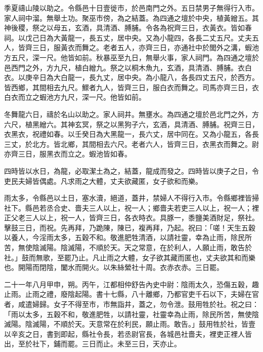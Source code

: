季夏禱山陵以助之。令縣邑十日壹徙市，於邑南門之外。五日禁男子無得行入市。家人祠中溜。無舉土功。聚巫市傍，為之結蓋。為四通之壇於中央，植黃繒五。其神後稷，祭之以母五，玄酒，具清酒、膊脯。令各為祝齊三日，衣黃衣。皆如春祠。以戊己日為大黃龍一，長五丈，居中央。又為小龍四，各長二丈五尺。丈夫五人，皆齊三日，服黃衣而舞之。老者五人，亦齊三日，亦通社中於閭外之溝，蝦池方五尺，深一尺。他皆如前。秋暴巫至九日，無舉火事，家人祠門。為四通之壇於邑西門之外，方九尺，植白繒九。祭之以桐木魚九，玄酒，具清酒、膊脯。衣白衣。以庚辛日為大白龍一，長九丈，居中央。為小龍八，各長四丈五尺，於西方。皆西鄉，其間相去九尺。鰥者九人，皆齊三日，服白衣而舞之。司馬亦齊三日，衣白衣而立之蝦池方九尺，深一尺。他皆如前。


冬舞龍六日，禱於名山以助之。家人祠井。無壅水。為四通之壇於邑北門之外，方六尺，植黑繒六。其神玄冥，祭之以黑狗子六，玄酒，具清酒、膊脯。祝齊三日，衣黑衣，祝禮如春。以壬癸日為大黑龍一，長六丈，居中同在。又為小龍五，各長三丈，於北方。皆北鄉，其間相去六尺。老者六人，皆齊三日，衣黑衣而舞之。尉亦齊三日，服黑衣而立之。蝦池皆如春。


四時皆以水日，為龍，必取潔土為之，結蓋，龍成而發之。四時皆以庚子之日，令吏民夫婦皆偶處。凡求雨之大體，丈夫欲藏匿，女子欲和而樂。




雨太多，令縣邑以土日，塞水瀆，絕道，蓋井，禁婦人不得行入市。令縣鄉裡皆掃社下。縣邑若丞合史、嗇夫三人以上，祝一人；鄉嗇夫若吏三人以上，祝一人；裡正父老三人以上，祝一人，皆齊三日，各衣時衣。具豚一，黍鹽美酒財足，祭社。擊鼓三日，而祝。先再拜，乃跪陳，陳已，複再拜，乃起。祝曰：「嗟！天生五穀以養人，今淫雨太多，五穀不和。敬進肥牲清酒，以請社靈，幸為止雨，除民所苦，無使陰滅陽。陰滅陽，不順於天。天之常意，在於利人，人願止雨，敢告於社。」鼓而無歌，至罷乃止。凡止雨之大體，女子欲其藏而匿也，丈夫欲其和而樂也。開陽而閉陰，闔水而開火。以朱絲縈社十周。衣赤衣赤。三日罷。

二十一年八月甲申，朔。丙午，江都相仲舒告內史中尉：陰雨太久，恐傷五穀，趣止雨。止雨之禮，廢陰起陽。書十七縣，八十離鄉，乃都官吏千石以下，夫婦在官者，咸遣婦歸。女子不得至市，市無詣井，蓋之，勿令泄。鼓用牲於社。祝之曰：「雨以太多，五穀不和，敬進肥牲，以請社靈，社靈幸為止雨，除民所苦，無使陰滅陽。陰滅陽，不順於天。天意常在於利民，願止雨。敢告。」鼓用牲於社，皆壹以辛亥之日，書到即起，縣社令長，若丞尉官長，各城邑社嗇夫，裡吏正裡人皆出，至於社下，鋪而罷。三日而止。未至三日，天亦止。


